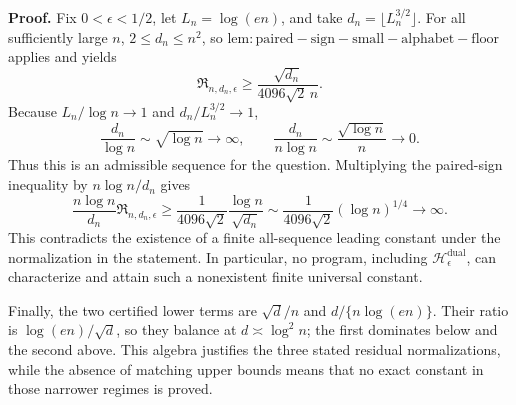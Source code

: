 \textbf{Proof.}
Fix \(0<\epsilon<1/2\), let \(L_n=\log(en)\), and take \(d_n=\lfloor L_n^{3/2}\rfloor\).  For all sufficiently large \(n\), \(2\le d_n\le n^2\), so \(\mathrm{lem:paired-sign-small-alphabet-floor}\) applies and yields
\[
 \mathfrak R_{n,d_n,\epsilon}
 \ge \frac{\sqrt{d_n}}{4096\sqrt2\,n}.
\]
Because \(L_n/\log n\to1\) and \(d_n/L_n^{3/2}\to1\),
\[
 \frac{d_n}{\log n}\sim\sqrt{\log n}\longrightarrow\infty,
 \qquad
 \frac{d_n}{n\log n}\sim\frac{\sqrt{\log n}}n
 \longrightarrow0.
\]
Thus this is an admissible sequence for the question.  Multiplying the paired-sign inequality by \(n\log n/d_n\) gives
\[
 \frac{n\log n}{d_n}\mathfrak R_{n,d_n,\epsilon}
 \ge \frac1{4096\sqrt2}\frac{\log n}{\sqrt{d_n}}
 \sim \frac1{4096\sqrt2}(\log n)^{1/4}
 \longrightarrow\infty.
\]
This contradicts the existence of a finite all-sequence leading constant under the normalization in the statement.  In particular, no program, including \(\mathscr H_\epsilon^{\mathrm{dual}}\), can characterize and attain such a nonexistent finite universal constant.

Finally, the two certified lower terms are \(\sqrt d/n\) and \(d/\{n\log(en)\}\).  Their ratio is \(\log(en)/\sqrt d\), so they balance at \(d\asymp\log^2 n\); the first dominates below and the second above.  This algebra justifies the three stated residual normalizations, while the absence of matching upper bounds means that no exact constant in those narrower regimes is proved.